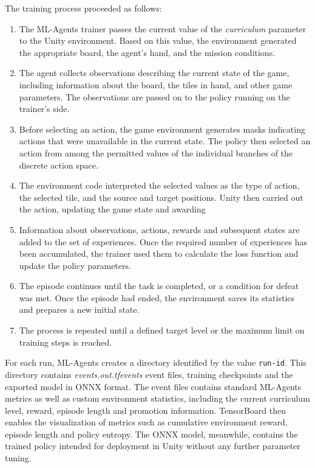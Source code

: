 The training process proceeded as follows:
\begin{enumerate}
	\item The ML-Agents trainer passes the current value of the \textit{curriculum} parameter to the Unity environment. Based on this value, the environment generated the appropriate board, the agent's hand, and the mission conditions.
	\item The agent collects observations describing the current state of the game, including information about the board, the tiles in hand, and other game parameters. The observations are passed on to the policy running on the trainer’s side.
	\item Before selecting an action, the game environment generates masks indicating actions that were unavailable in the current state. The policy then selected an action from among the permitted values of the individual branches of the discrete action space.
	\item The environment code interpreted the selected values as the type of action, the selected tile, and the source and target positions. Unity then carried out the action, updating the game state and awarding 
	\item Information about observations, actions, rewards and subsequent states are added to the set of experiences. Once the required number of experiences has been accumulated, the trainer used them to calculate the loss function and update the policy parameters.
	\item The episode continues until the task is completed, or a condition for defeat was met. Once the episode had ended, the environment saves its statistics and prepares a new initial state.
	\item The process is repeated until a defined target level or the maximum limit on training steps is reached.
\end{enumerate}
For each run, ML-Agents creates a directory identified by the value \texttt{run-id}. This directory contains \textit{events.out.tfevents} event files, training checkpoints and the exported model in ONNX format. The event files contains standard ML-Agents metrics as well as custom environment statistics, including the current curriculum level, reward, episode length and promotion information. TensorBoard then enables the visualization of metrics such as cumulative environment reward, episode length and policy entropy. The ONNX model, meanwhile, contains the trained policy intended for deployment in Unity without any further parameter tuning.

